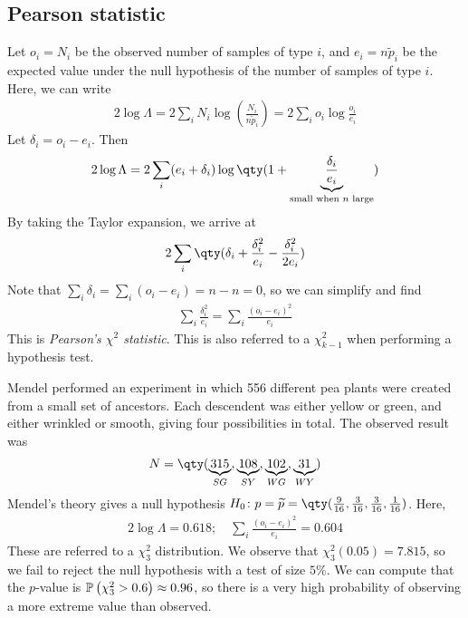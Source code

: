 \subsection{Pearson statistic}
Let $o_i = N_i$ be the observed number of samples of type $i$, and $e_i = n \widetilde p_i$ be the expected value under the null hypothesis of the number of samples of type $i$.
Here, we can write
\begin{align*}
	2 \log \Lambda = 2 \sum_i N_i \log(\frac{N_i}{n \widetilde p_i}) = 2 \sum_i o_i \log \frac{o_i}{e_i}
\end{align*}
Let $\delta_i = o_i - e_i$.
Then
\begin{align*}
	2 \log \Lambda = 2 \sum_i (e_i + \delta_i) \log\qty(1 + \underbrace{\frac{\delta_i}{e_i}}_{\text{small when } n \text{ large}})
\end{align*}
By taking the Taylor expansion, we arrive at
\begin{align*}
	2 \sum_i \qty(\delta_i + \frac{\delta_i^2}{e_i} - \frac{\delta_i^2}{2e_i})
\end{align*}
Note that $\sum_i \delta_i = \sum_i (o_i - e_i) = n - n = 0$, so we can simplify and find
\begin{align*}
	\sum_i \frac{\delta_i^2}{e_i} = \sum_i \frac{(o_i - e_i)^2}{e_i}
\end{align*}
This is \textit{Pearson's $\chi^2$ statistic}.
This is also referred to a $\chi^2_{k-1}$ when performing a hypothesis test.
\begin{example}
	Mendel performed an experiment in which 556 different pea plants were created from a small set of ancestors.
	Each descendent was either yellow or green, and either wrinkled or smooth, giving four possibilities in total.
	The observed result was
	\begin{align*}
		N = \qty(\underbrace{315}_{SG}, \underbrace{108}_{SY}, \underbrace{102}_{WG}, \underbrace{31}_{WY})
	\end{align*}
	Mendel's theory gives a null hypothesis $H_0 \colon p = \widetilde p = \qty(\frac{9}{16}, \frac{3}{16}, \frac{3}{16}, \frac{1}{16})$.
	Here,
	\begin{align*}
		2 \log \Lambda = 0.618;\quad \sum_i \frac{(o_i - e_i)^2}{e_i} = 0.604
	\end{align*}
	These are referred to a $\chi^2_3$ distribution.
	We observe that $\chi^2_3(0.05) = 7.815$, so we fail to reject the null hypothesis with a test of size $5\%$.
	We can compute that the $p$-value is $\mathbb{P}\left({\chi^2_3 > 0.6}\right) \approx 0.96$, so there is a very high probability of observing a more extreme value than observed.
\end{example}

